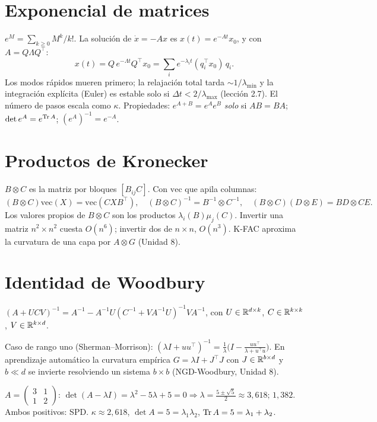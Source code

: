 \documentclass[11pt,a4paper]{article}
\begin{document}
\section{Exponencial de matrices}
$e^{M}=\sum_{k\ge0}M^k/k!$. La solución de $\dot x=-Ax$ es $x(t)=e^{-At}x_0$, y con $A=Q\Lambda Q^\top$:
\begin{equation}x(t)=Q\,e^{-\Lambda t}Q^\top x_0=\sum_ie^{-\lambda_it}(q_i^\top x_0)\,q_i .\end{equation}
Los modos rápidos mueren primero; la relajación total tarda $\sim1/\lambda_{\min}$ y la integración explícita
(Euler) es estable solo si $\Delta t<2/\lambda_{\max}$ (lección 2.7). El número de pasos escala como $\kappa$.
Propiedades: $e^{A+B}=e^Ae^B$ \emph{solo} si $AB=BA$; $\det e^A=e^{\operatorname{Tr} A}$; $(e^A)^{-1}=e^{-A}$.

\section{Productos de Kronecker}
$B\otimes C$ es la matriz por bloques $[B_{ij}C]$. Con $\mathrm{vec}$ que apila columnas:
\begin{equation}(B\otimes C)\mathrm{vec}(X)=\mathrm{vec}(CXB^\top),\quad(B\otimes C)^{-1}=B^{-1}\otimes C^{-1},\quad
(B\otimes C)(D\otimes E)=BD\otimes CE.\end{equation}
Los valores propios de $B\otimes C$ son los productos $\lambda_i(B)\mu_j(C)$. Invertir una matriz $n^2\times n^2$ cuesta
$O(n^6)$; invertir dos de $n\times n$, $O(n^3)$. K-FAC aproxima la curvatura de una capa por $A\otimes G$ (Unidad 8).

\section{Identidad de Woodbury}
\begin{resultado}
$(A+UCV)^{-1}=A^{-1}-A^{-1}U(C^{-1}+VA^{-1}U)^{-1}VA^{-1}$, con $U\in\mathbb{R}^{d\times k}$, $C\in\mathbb{R}^{k\times k}$, $V\in\mathbb{R}^{k\times d}$.
\end{resultado}
Caso de rango uno (Sherman--Morrison): $(\lambda I+uu^\top)^{-1}=\frac1\lambda\big(I-\frac{uu^\top}{\lambda+u^\top u}\big)$.
En aprendizaje automático la curvatura empírica $G=\lambda I+J^\top J$ con $J\in\mathbb{R}^{b\times d}$ y $b\ll d$ se invierte
resolviendo un sistema $b\times b$ (NGD-Woodbury, Unidad 8).

\begin{ejemplo}
$A=\begin{pmatrix}3&1\\1&2\end{pmatrix}$: $\det(A-\lambda I)=\lambda^2-5\lambda+5=0\Rightarrow\lambda=\frac{5\pm\sqrt5}2\approx3{,}618;\,1{,}382$.
Ambos positivos: SPD. $\kappa\approx2{,}618$, $\det A=5=\lambda_1\lambda_2$, $\operatorname{Tr} A=5=\lambda_1+\lambda_2$.
\end{ejemplo}
\end{document}
